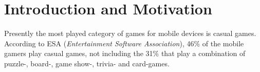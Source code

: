 \chapter{Introduction and Motivation}
Presently the most played category of games for mobile devices is casual games.
According to ESA\cite{ESA}\cite{ESApdf} (\textit{Entertainment Software Association}), 46\% of the mobile gamers play casual games, not including the 31\% that play a combination of puzzle-, board-, game show-, trivia- and card-games.

\label{sec:specifyingtheproblemstatement}



%
